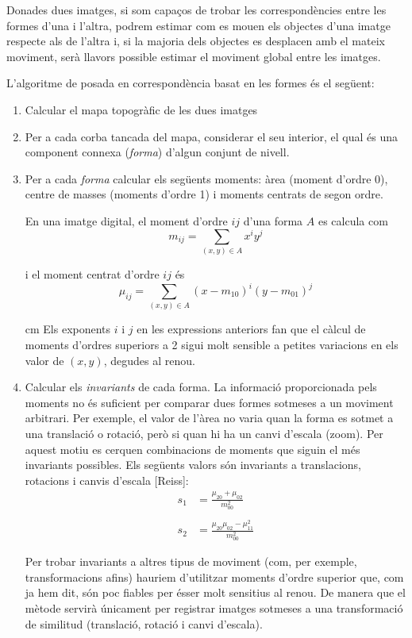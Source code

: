 \documentclass{article}
\begin{document}
Donades dues imatges, si som capa\c{c}os de trobar les correspond\`encies entre les formes d'una i l'altra,
podrem estimar com es mouen els objectes d'una imatge respecte als de l'altra i, si la majoria dels objectes es
desplacen amb el mateix moviment, ser\`a llavors possible estimar el moviment global entre les imatges.


L'algoritme de posada en correspond\`encia basat en les formes \'es el seg\"uent:
\begin{enumerate}
\item Calcular el mapa topogr\`afic de les dues imatges

\item Per a cada corba tancada del mapa, considerar el seu interior, el qual \'es una component connexa ({\it forma})
d'algun conjunt de nivell. 

\item Per a cada {\it forma} calcular els seg\"uents moments: 
\`area (moment d'ordre 0), centre de masses (moments d'ordre 1)
i moments centrats de segon ordre. 

En una imatge digital, 
el moment d'ordre $ij$ d'una forma $A$ es calcula com
\[
m_{ij}=\sum_{(x, y) \in A} x^i y^j
\]

i el moment centrat d'ordre $ij$ \'es
\[
\mu_{ij}=\sum_{(x, y) \in A} (x-m_{10})^i (y-m_{01})^j
\]


 cm
Els exponents $i$ i $j$ en les expressions anteriors fan que el c\`alcul de moments d'ordres superiors a 2
sigui molt sensible a petites variacions en els valor de $(x, y)$, degudes al renou. 


\item Calcular els {\it invariants} de cada forma. La informaci\'o proporcionada pels moments no \'es 
suficient per comparar dues formes sotmeses a un moviment arbitrari. Per exemple, el valor de l'\`area
no varia quan la forma es sotmet a una translaci\'o o rotaci\'o, per\`o si quan hi ha un canvi d'escala (zoom).
Per aquest motiu es cerquen combinacions de moments que siguin el m\'es invariants possibles. Els seg\"uents
valors s\'on invariants a translacions, rotacions i canvis d'escala [Reiss]:
\[
\begin{split}
s_1 & =\frac{\mu_{20}+\mu_{02}}{m_{00}^2} \\ \\
s_2 & =\frac{\mu_{20} \mu_{02}- \mu_{11}^2}{m_{00}^2}
\end{split}
\]

Per trobar invariants a altres tipus de moviment (com, per exemple, transformacions afins) hauriem d'utilitzar
moments d'ordre superior que, com ja hem dit, s\'on poc fiables per \'esser molt sensitius al renou.
De manera que el m\`etode servir\`a \'unicament per registrar imatges sotmeses a una transformaci\'o de similitud
(translaci\'o, rotaci\'o i canvi d'escala).



\end{enumerate}
\end{document}
